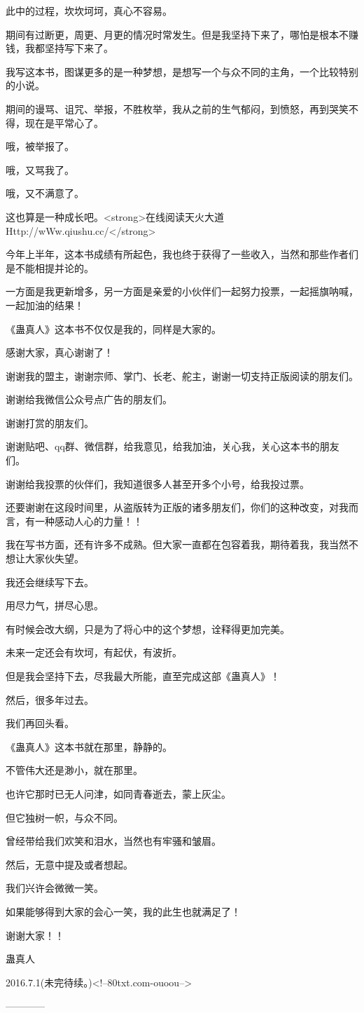 \begin{this_body}
此中的过程，坎坎坷坷，真心不容易。

期间有过断更，周更、月更的情况时常发生。但是我坚持下来了，哪怕是根本不赚钱，我都坚持写下来了。

我写这本书，图谋更多的是一种梦想，是想写一个与众不同的主角，一个比较特别的小说。

期间的谩骂、诅咒、举报，不胜枚举，我从之前的生气郁闷，到愤怒，再到哭笑不得，现在是平常心了。

哦，被举报了。

哦，又骂我了。

哦，又不满意了。

这也算是一种成长吧。<strong>在线阅读天火大道Http://wWw.qiushu.cc/</strong>

今年上半年，这本书成绩有所起色，我也终于获得了一些收入，当然和那些作者们是不能相提并论的。

一方面是我更新增多，另一方面是亲爱的小伙伴们一起努力投票，一起摇旗呐喊，一起加油的结果！

《蛊真人》这本书不仅仅是我的，同样是大家的。

感谢大家，真心谢谢了！

谢谢我的盟主，谢谢宗师、掌门、长老、舵主，谢谢一切支持正版阅读的朋友们。

谢谢给我微信公众号点广告的朋友们。

谢谢打赏的朋友们。

谢谢贴吧、qq群、微信群，给我意见，给我加油，关心我，关心这本书的朋友们。

谢谢给我投票的伙伴们，我知道很多人甚至开多个小号，给我投过票。

还要谢谢在这段时间里，从盗版转为正版的诸多朋友们，你们的这种改变，对我而言，有一种感动人心的力量！！

我在写书方面，还有许多不成熟。但大家一直都在包容着我，期待着我，我当然不想让大家伙失望。

我还会继续写下去。

用尽力气，拼尽心思。

有时候会改大纲，只是为了将心中的这个梦想，诠释得更加完美。

未来一定还会有坎坷，有起伏，有波折。

但是我会坚持下去，尽我最大所能，直至完成这部《蛊真人》！

然后，很多年过去。

我们再回头看。

《蛊真人》这本书就在那里，静静的。

不管伟大还是渺小，就在那里。

也许它那时已无人问津，如同青春逝去，蒙上灰尘。

但它独树一帜，与众不同。

曾经带给我们欢笑和泪水，当然也有牢骚和皱眉。

然后，无意中提及或者想起。

我们兴许会微微一笑。

如果能够得到大家的会心一笑，我的此生也就满足了！

谢谢大家！！

蛊真人

2016.7.1(未完待续。)<!--80txt.com-ouoou-->

------------

\end{this_body}

